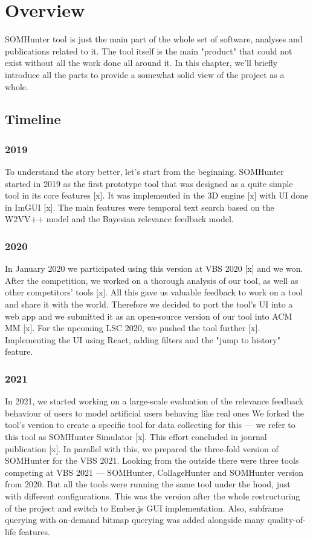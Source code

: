 \chapter{Overview}
\label{overview}

SOMHunter tool is just the main part of the whole set of software, analyses and publications related to it. The tool itself is the main "product" that could not exist without all the work done all around it. In this chapter, we'll briefly introduce all the parts to provide a somewhat solid view of the project as a whole.

\section{Timeline}

\subsection{2019}
To understand the story better, let's start from the beginning. SOMHunter started in 2019 as the first prototype tool that was designed as a quite simple tool in its core features [x]. It was implemented in the 3D engine [x] with UI done in ImGUI [x]. The main features were temporal text search based on the W2VV++ model and the Bayesian relevance feedback model. 
\subsection{2020}
In January 2020 we participated using this version at VBS 2020 [x] and we won. After the competition, we worked on a thorough analysis of our tool, as well as other competitors' tools [x]. All this gave us valuable feedback to work on a tool and share it with the world. Therefore we decided to port the tool's UI into a web app and we submitted it as an open-source version of our tool into ACM MM [x]. For the upcoming LSC 2020, we pushed the tool further [x]. Implementing the UI using React, adding filters and the "jump to history" feature.
\subsection{2021}
In 2021, we started working on a large-scale evaluation of the relevance feedback behaviour of users to model artificial users behaving like real ones We forked the tool's version to create a specific tool for data collecting for this --- we refer to this tool as SOMHunter Simulator [x]. This effort concluded in journal publication [x]. In parallel with this, we prepared the three-fold version of SOMHunter for the VBS 2021. Looking from the outside there were three tools competing at VBS 2021 --- SOMHunter, CollageHunter and SOMHunter version from 2020. But all the tools were running the same tool under the hood, just with different configurations. This was the version after the whole restructuring of the project and switch to Ember.js GUI implementation. Also, subframe querying with on-demand bitmap querying was added alongside many quality-of-life features.

